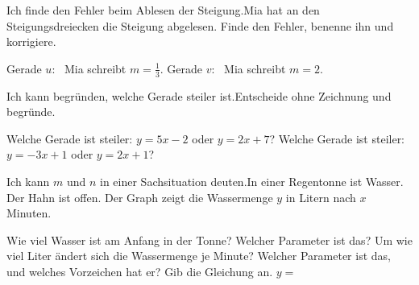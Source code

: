 
\begin{aufgabe}{Ich finde den Fehler beim Ablesen der Steigung.\newline Mia hat an den Steigungsdreiecken die Steigung abgelesen. Finde den Fehler, benenne ihn und korrigiere.}

\begin{ksys}[xmin=-3,xmax=3,ymin=-4,ymax=6,ablesen]
\end{ksys}

\begin{teile}
\teil Gerade $u$: \ Mia schreibt $m = \frac{1}{3}$.
\teil Gerade $v$: \ Mia schreibt $m = 2$.
\end{teile}
\end{aufgabe}

\begin{aufgabe}{Ich kann begründen, welche Gerade steiler ist.\newline Entscheide ohne Zeichnung und begründe.}
\begin{teile}
\teil Welche Gerade ist steiler: $y = 5x - 2$ oder $y = 2x + 7$?
\teil Welche Gerade ist steiler: $y = -3x + 1$ oder $y = 2x + 1$?
\end{teile}
\end{aufgabe}

\begin{aufgabe}{Ich kann $m$ und $n$ in einer Sachsituation deuten.\newline In einer Regentonne ist Wasser. Der Hahn ist offen. Der Graph zeigt die Wassermenge $y$ in Litern nach $x$ Minuten.}

\begin{ksys}[xmin=0,xmax=16,ymin=0,ymax=70,xstep=2,ystep=10,ablesen,xlabel=$x$ in min,ylabel=$y$ in l]
\end{ksys}

\begin{teile}
\teil Wie viel Wasser ist am Anfang in der Tonne? Welcher Parameter ist das? \quad \leerfeld
\teil Um wie viel Liter ändert sich die Wassermenge je Minute? Welcher Parameter ist das, und welches Vorzeichen hat er? \quad \leerfeld
\teil Gib die Gleichung an. \quad $y = $ \leerfeld
\end{teile}
\end{aufgabe}
